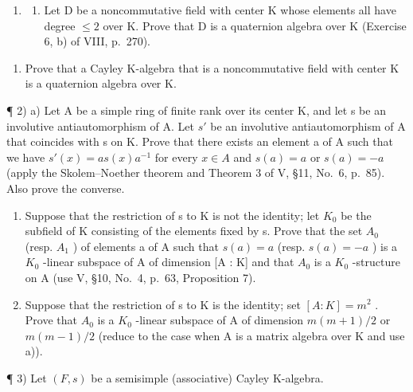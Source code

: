 
\begin{enumerate}
\def\labelenumi{\arabic{enumi})}
\tightlist
\item
  \begin{enumerate}
  \def\labelenumii{\alph{enumii})}
  \tightlist
  \item
    Let D be a noncommutative field with center K whose elements all have degree \(\leqslant 2\) over K. Prove that D is a quaternion algebra over K (Exercise 6, b) of VIII, p.~270).
  \end{enumerate}
\end{enumerate}

\begin{enumerate}
\def\labelenumi{\alph{enumi})}
\setcounter{enumi}{1}
\tightlist
\item
  Prove that a Cayley K-algebra that is a noncommutative field with center K is a quaternion algebra over K.
\end{enumerate}

¶ 2) a) Let A be a simple ring of finite rank over its center K, and let s be an involutive antiautomorphism of A. Let \(s'\) be an involutive antiautomorphism of A that coincides with s on K. Prove that there exists an element a of A such that we have \(s'(x) = as(x)a^{-1}\) for every \(x \in A\) and \(s(a) = a\) or \(s(a) = -a\) (apply the Skolem--Noether theorem and Theorem 3 of V, §11, No.~6, p.~85). Also prove the converse.

\begin{enumerate}
\def\labelenumi{\alph{enumi})}
\setcounter{enumi}{1}
\item
  Suppose that the restriction of s to K is not the identity; let \(K_{0}\) be the subfield of K consisting of the elements fixed by s. Prove that the set \(A_{0}\) (resp. \(A_{1}\) ) of elements a of A such that \(s(a) = a\) (resp. \(s(a) = -a\) ) is a \(K_{0}\) -linear subspace of A of dimension {[}A : K{]} and that \(A_{0}\) is a \(K_{0}\) -structure on A (use V, §10, No.~4, p.~63, Proposition 7).
\item
  Suppose that the restriction of s to K is the identity; set \([A:K]=m^{2}\) . Prove that \(A_{0}\) is a \(K_{0}\) -linear subspace of A of dimension \(m(m+1)/2\) or \(m(m-1)/2\) (reduce to the case when A is a matrix algebra over K and use a)).
\end{enumerate}

¶ 3) Let \((F, s)\) be a semisimple (associative) Cayley K-algebra.

